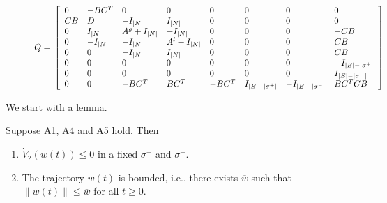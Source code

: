 \setcounter{TempEqCnt2}{\value{equation}}
\setcounter{equation}{1}
    \begin{figure*}[!t]
    \normalsize
    \begin{equation}
        \label{eq:Q}
        Q=\\
        	\left[
        	\begin{array}{llllllll}
        		0  & -BC^T   & 0           & 0           & 0        & 0     & 0 & 0 \\
        		CB &   D     & -I_{|N|}    & I_{|N|}     & 0        & 0     & 0 & 0 \\
        		0  &I_{|N|}  & A^g+I_{|N|} & -I_{|N|}    & 0        & 0     & 0 & -CB \\
        		0  &-I_{|N|} & -I_{|N|}    & A^l+I_{|N|} & 0        & 0     & 0 & CB \\
        		0  &0        & -I_{|N|}    & I_{|N|}     & 0        & 0     & 0 & CB \\
        		0  &0        & 0           &   0         & 0        & 0     & 0 & -I_{|E|-|\sigma^+|} \\
        		0  &0        & 0           &   0         & 0        & 0     & 0 & I_{|E|-|\sigma^-|} \\
        		0  &0        & -BC^T        &  BC^T      & -BC^T    &I_{|E|-|\sigma^+|}     &-I_{|E|-|\sigma^-|} & BC^TCB \\
        	\end{array} 
        		\right]
      \end{equation}
        		\hrulefill
        		\vspace*{4pt}
      \end{figure*}  
\setcounter{equation}{\value{TempEqCnt2}} 

        
We start with a lemma.
        
        \begin{lemma}
        	\label{lemma:decreasing.2}
        	Suppose A1, A4 and A5 hold. Then 
        	\begin{enumerate}
        		\item $\dot V_2(w(t))\leq 0 $ in a fixed $\sigma^+$ and $\sigma^-$.
        		\item The trajectory $w(t)$ is bounded, i.e., there exists $\overline w$ such
        		that $\|w(t)\|\leq \overline w$ for all $t\geq 0$.
        	\end{enumerate}  	
        \end{lemma}
        
